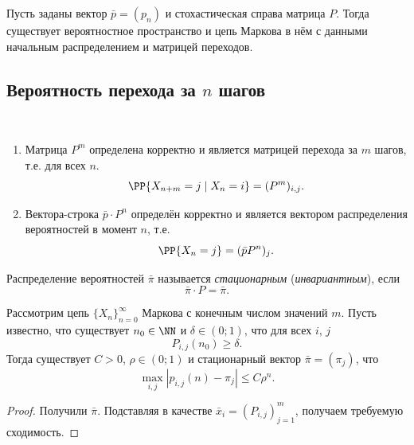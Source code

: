 \documentclass[12pt,a4paper]{article}
\begin{document}
    \begin{theorem}
        Пусть заданы вектор $\bar{p} = (p_n)$ и стохастическая справа матрица $P$. Тогда существует вероятностное пространство и цепь Маркова в нём с данными начальным распределением и матрицей переходов.
    \end{theorem}

    \subsection{Вероятность перехода за $n$ шагов}

    \begin{lemma}\ 
        \begin{enumerate}
            \item Матрица $P^m$ определена корректно и является матрицей перехода за $m$ шагов, т.е. для всех $n$.
                \[\PP\{X_{n+m} = j \mid X_n = i\} = (P^m)_{i, j}.\]
            \item Вектора-строка $\bar{p} \cdot P^n$ определён корректно и является вектором распределения вероятностей в момент $n$, т.е.
                \[\PP\{X_n = j\} = (\bar{p} P^n)_j.\]
        \end{enumerate}
    \end{lemma}

    \begin{definition}
        Распределение вероятностей $\bar{\pi}$ называется \emph{стационарным} (\emph{инвариантным}), если
        \[\bar{\pi} \cdot P = \bar{\pi}.\]
    \end{definition}

    \begin{theorem}
        Рассмотрим цепь $\{X_n\}_{n=0}^\infty$ Маркова с конечным числом значений $m$. Пусть известно, что существует $n_0 \in \NN$ и $\delta \in (0; 1)$, что для всех $i$, $j$
        \[P_{i, j}(n_0) \geqslant \delta.\]
        Тогда существует $C > 0$, $\rho \in (0; 1)$ и стационарный вектор $\bar{\pi} = (\pi_j)$, что
        \[\max_{i,j} |p_{i,j}(n) - \pi_j| \leqslant C \rho^n.\]
    \end{theorem}

    \begin{proof}

        Получили $\bar{\pi}$. Подставляя в качестве $\bar{x}_i = (P_{i,j})_{j=1}^m$, получаем требуемую сходимость.

    \end{proof}
\end{document}
